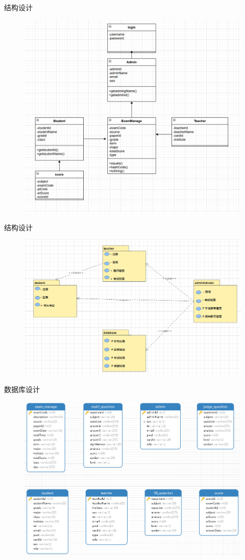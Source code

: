 \documentclass{beamer}
\begin{document}
\begin{frame}{结构设计}
    \begin{figure}
        \centering
        \includegraphics[width=0.65\linewidth]{class diagram.png}
    \end{figure}
\end{frame}
\begin{frame}{结构设计}
    \begin{figure}
        \centering
        \includegraphics[width=0.85\linewidth]{package diagram.png}
    \end{figure}
\end{frame}
\begin{frame}{数据库设计}
    \begin{figure}
        \centering
        \includegraphics[width=0.85\linewidth]{database design.png}
    \end{figure}
\end{frame}
\end{document}

